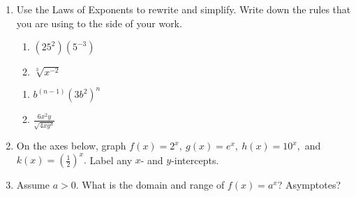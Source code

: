 \documentclass[11pt,fleqn]{article}
\begin{document}
\renewcommand{\headrulewidth}{0pt}
\newcommand{\blank}[1]{\rule{#1}{0.75pt}}
\renewcommand{\d}{\displaystyle}


\vspace*{-0.7in}
\begin{center}
  \LARGE {}
\end{center}
\begin{enumerate}
\item Use the Laws of Exponents to rewrite and simplify. Write down the rules that you are using to the side of your work.
\begin{multicols}{2}
\begin{enumerate}
\item $(25^2)(5^{-3})$
\item $\sqrt[3]{x^{-2}}$
\end{enumerate} 
\end{multicols}
\vfill
\begin{multicols}{2}
\begin{enumerate}[label=\alph*.,start=3]
\item $b^{(n-1)}(3b^2)^n$
\item $\frac{6x^2y}{\sqrt{4xy^3}}$
\end{enumerate} 
\end{multicols}
\vfill
\item On the axes below, graph $f(x)=2^x,\: g(x)=e^x,\: h(x)=10^x,$ and $k(x)=\left(\frac{1}{2} \right)^x.$ Label any $x$- and $y$-intercepts.

\begin{center}
\end{center}
\newpage
\item Assume $a >0.$ What is the domain and range of $f(x)=a^x$? Asymptotes?
\vspace{1in}


\end{enumerate}
\end{document}
